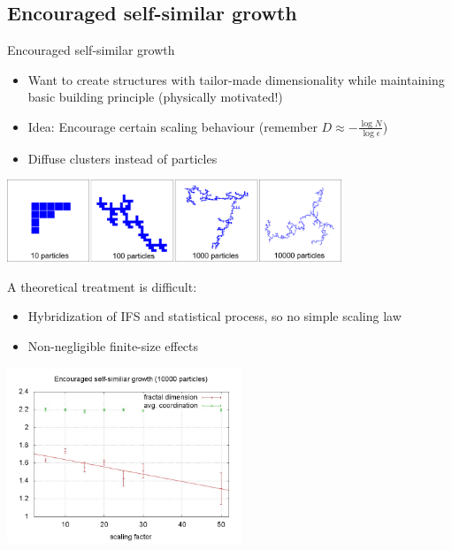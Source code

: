 \documentclass[smaller]{beamer}
\begin{document}
        \subsection{Encouraged self-similar growth}
            \begin{frame}{Encouraged self-similar growth}
                \begin{center}
                    \begin{itemize}
                        \item Want to create structures with tailor-made dimensionality while maintaining basic building principle (physically motivated!)
                        \item Idea: Encourage certain scaling behaviour (remember $D\approx -\frac{\log{N}}{\log{\epsilon}}$)
                        \item Diffuse clusters instead of particles
                    \end{itemize}

                    \vspace{.5cm}
                    \includegraphics[width=10cm]{img/self-sim_01.png}
                \end{center}
            \end{frame}           

            \begin{frame}
                A theoretical treatment is difficult:
                \begin{itemize}
                    \item Hybridization of IFS and statistical process, so no simple scaling law
                    \item Non-negligible finite-size effects
                \end{itemize}

                \begin{center}
                    \includegraphics[width=7cm]{img/self-sim_02.jpg}
                \end{center}
            \end{frame}
\end{document}

